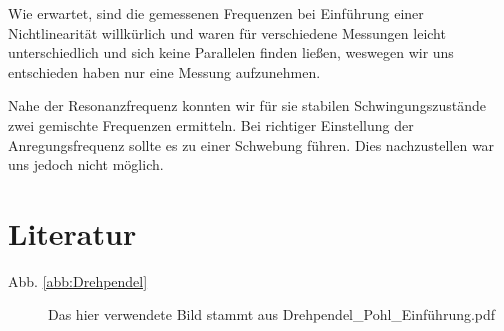 \documentclass[11pt,a4paper,titlepage, ngerman]{article}
\newcommand{\refabb}[1]{Abb. \ref{abb:#1}}
\begin{document}
			Wie erwartet, sind die gemessenen Frequenzen bei Einführung einer Nichtlinearität willkürlich und waren für verschiedene Messungen leicht unterschiedlich und sich keine Parallelen finden ließen, weswegen wir uns entschieden haben nur eine Messung aufzunehmen.
			
			Nahe der Resonanzfrequenz konnten wir für sie stabilen Schwingungszustände zwei gemischte Frequenzen ermitteln. Bei richtiger Einstellung der Anregungsfrequenz sollte es zu einer Schwebung führen. Dies nachzustellen war uns jedoch nicht möglich.

	\vspace{1cm}		
	\section*{Literatur}
		\begin{description}
			\item[\refabb{Drehpendel}] Das hier verwendete Bild stammt aus \glqq Drehpendel\_Pohl\_Einführung.pdf\grqq
		\end{description}
\end{document}
